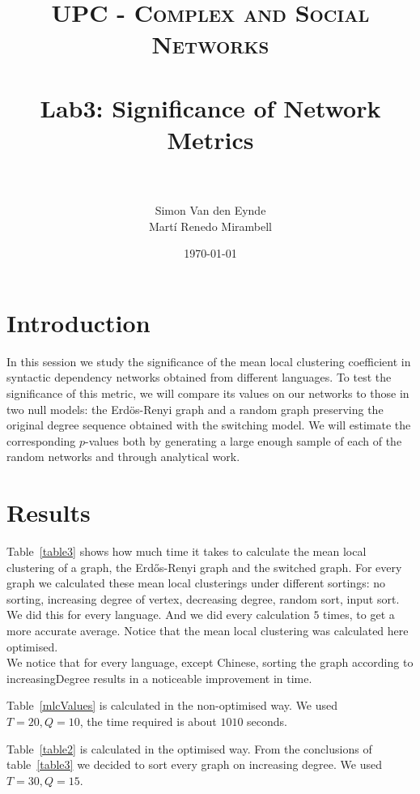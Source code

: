 \documentclass[paper=a4, fontsize=11pt]{scrartcl} %
\title{	
\normalfont \normalsize 
\textsc{UPC - Complex and Social Networks} \\ [25pt] %
\horrule{0.5pt} \\[0.4cm] %
\huge Lab3: Significance of Network Metrics \\ %
\horrule{2pt} \\[0.5cm] %
}
\author{Simon Van den Eynde\\ Martí Renedo Mirambell} %
\date{\normalsize\today} %
\begin{document}
\maketitle %



\section{Introduction}
In this session we study the significance of the mean local clustering coefficient in syntactic dependency networks obtained from different languages. To test the significance of this metric, we will compare its values on our networks to those in two null models: the Erdös-Renyi graph and a random graph preserving the original degree sequence obtained with the switching model.  We will estimate the corresponding $p$-values both by generating a large enough sample of each of the random networks and through analytical work.

\section{Results}
Table~\ref{table3} shows how much time it takes to calculate the mean local clustering of a graph, the Erd\H{o}s-Renyi graph and the switched graph. For every graph we calculated these mean local clusterings under different sortings: no sorting, increasing degree of vertex, decreasing degree, random sort, input sort. We did this for every language. And we did every calculation $5$ times, to get a more accurate average. Notice that the mean local clustering was calculated here optimised.\\
We notice that for every language, except Chinese, sorting the graph according to increasingDegree results in a noticeable improvement in time.

Table~\ref{mlcValues} is calculated in the non-optimised way. We used $T=20,Q=10$, the time required is about $1010$ seconds.

Table~\ref{table2} is calculated in the optimised way. From the conclusions of table~\ref{table3} we decided to sort every graph on increasing degree. We used $T=30,Q=15$.
\end{document}
